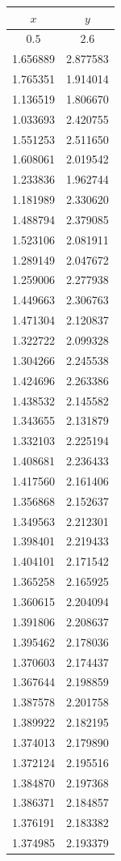 \begin{table}[H]
	\centering
	\begin{tabular}{|c | c|}
		\hline
		$x$      & $y$      \\
		\hline
		$0.5$    & $2.6$    \\
		1.656889 & 2.877583 \\
		1.765351 & 1.914014 \\
		1.136519 & 1.806670 \\
		1.033693 & 2.420755 \\
		1.551253 & 2.511650 \\
		1.608061 & 2.019542 \\
		1.233836 & 1.962744 \\
		1.181989 & 2.330620 \\
		1.488794 & 2.379085 \\
		1.523106 & 2.081911 \\
		1.289149 & 2.047672 \\
		1.259006 & 2.277938 \\
		1.449663 & 2.306763 \\
		1.471304 & 2.120837 \\
		1.322722 & 2.099328 \\
		1.304266 & 2.245538 \\
		1.424696 & 2.263386 \\
		1.438532 & 2.145582 \\
		1.343655 & 2.131879 \\
		1.332103 & 2.225194 \\
		1.408681 & 2.236433 \\
		1.417560 & 2.161406 \\
		1.356868 & 2.152637 \\
		1.349563 & 2.212301 \\
		1.398401 & 2.219433 \\
		1.404101 & 2.171542 \\
		1.365258 & 2.165925 \\
		1.360615 & 2.204094 \\
		1.391806 & 2.208637 \\
		1.395462 & 2.178036 \\
		1.370603 & 2.174437 \\
		1.367644 & 2.198859 \\
		1.387578 & 2.201758 \\
		1.389922 & 2.182195 \\
		1.374013 & 2.179890 \\
		1.372124 & 2.195516 \\
		1.384870 & 2.197368 \\
		1.386371 & 2.184857 \\
		1.376191 & 2.183382 \\
		1.374985 & 2.193379 \\
		\hline
	\end{tabular}
\end{table}

